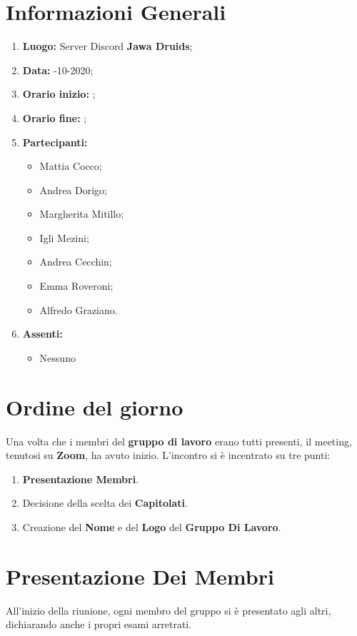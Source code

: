 	\newpage
	\section{Informazioni Generali}
	\begin{enumerate}
		\item \textbf{Luogo:} \normalfont Server Discord \textbf{Jawa Druids};
		\item \textbf{Data:} -10-2020;
		\item \textbf{Orario inizio:} ;
		\item \textbf{Orario fine:} ;
		\item \textbf{Partecipanti:}
		\begin{itemize}
			\item Mattia Cocco;
			\item Andrea Dorigo;
			\item Margherita Mitillo;
			\item Igli Mezini;
			\item Andrea Cecchin;
			\item Emma Roveroni;
			\item Alfredo Graziano.
		\end{itemize}
		\item \textbf{Assenti:}
		\begin{itemize}
			\item Nessuno
		\end{itemize}
	\end{enumerate}
	\section{Ordine del giorno}
	Una volta che i membri del \textbf{gruppo di lavoro} erano tutti presenti, il meeting, tenutosi su \textbf{Zoom}, ha avuto inizio.
	L'incontro si è incentrato su tre punti:
	\begin{enumerate}
		\item \textbf{Presentazione Membri}.		
		\item Decisione della scelta dei \textbf{Capitolati}.
		\item Creazione del \textbf{Nome} e del \textbf{Logo} del \textbf{Gruppo Di Lavoro}.
	\end{enumerate}

	\section{Presentazione Dei Membri}
	All'inizio della riunione, ogni membro del gruppo si è presentato agli altri, dichiarando anche i propri esami arretrati.

